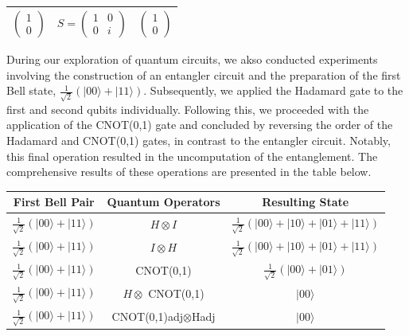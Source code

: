 \documentclass[onecolumn,10pt,cleanfoot]{asme2ej}
\begin{document}
\begin{center}
\begin{tabular}{|c|c|c|}
\hline
$\begin{pmatrix} 1 \\ 0 \end{pmatrix}$ & $S = \begin{pmatrix} 1 & 0 \\ 0 & i \end{pmatrix}$ & $\begin{pmatrix} 1 \\ 0 \end{pmatrix}$ \\
\hline
\end{tabular}
\end{center}

During our exploration of quantum circuits, we akso conducted experiments involving the construction of an entangler circuit and the preparation of the first Bell state, $\frac{1}{\sqrt{2}}(|00\rangle + |11\rangle)$. Subsequently, we applied the Hadamard gate to the first and second qubits individually. Following this, we proceeded with the application of the CNOT(0,1) gate and concluded by reversing the order of the Hadamard and CNOT(0,1) gates, in contrast to the entangler circuit. Notably, this final operation resulted in the uncomputation of the entanglement. The comprehensive results of these operations are presented in the table below.

\begin{center}
\begin{tabular}{|c|c|c|}
\hline
First Bell Pair & Quantum Operators & Resulting State \\
\hline
$\frac{1}{\sqrt{2}}(|00\rangle + |11\rangle)$ & $H \otimes I$ & $\frac{1}{\sqrt{2}}(|00\rangle + |10\rangle + |01\rangle + |11\rangle)$ \\
$\frac{1}{\sqrt{2}}(|00\rangle + |11\rangle)$ & $I \otimes H$ & $\frac{1}{\sqrt{2}}(|00\rangle + |10\rangle + |01\rangle + |11\rangle)$ \\
$\frac{1}{\sqrt{2}}(|00\rangle + |11\rangle)$ & CNOT(0,1) & $\frac{1}{\sqrt{2}}(|00\rangle + |01\rangle)$ \\
$\frac{1}{\sqrt{2}}(|00\rangle + |11\rangle)$ & $H \otimes$ CNOT(0,1) & $|00\rangle$ \\
$\frac{1}{\sqrt{2}}(|00\rangle + |11\rangle)$ & CNOT(0,1)adj$\otimes$Hadj & $|00\rangle$ \\
\hline
\end{tabular}
\end{center}
\end{document}
